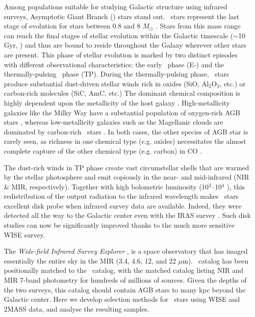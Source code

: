 Among populations suitable for studying Galactic structure using infrared surveys, Asymptotic Giant 
Branch (\agb) stars stand out. \agb\ stars represent the last stage of evolution for stars between 0.8 and 8 $M_\odot$ \citep{1983ARA&A..21..271I, 2005ARA&A..43..435H}. Stars from this mass range can reach the final stages of stellar evolution within the Galactic timescale ($\sim$10 Gyr, \citealt{1983ARA&A..21..271I}) and thus are bound to reside throughout the Galaxy wherever other stars are present. This phase of stellar evolution is marked by two distinct
episodes with different observational characteristics: the early \agb\, phase (E-\agb)  and the thermally-pulsing \agb\, phase (TP). During the thermally-pulsing phase, \agb\, stars produce substantial dust-driven stellar winds \citep[$10^{-7} < \dot{M} < 10^{-4}$ $M_\odot$ yr$^{-1}$,][]{2002A&A...391.1053O} rich in oxides (SiO, Al$_2$O$_3$, etc.) or carbon-rich molecules (SiC, AmC, etc.) The dominant chemical composition is highly dependent upon the metallicity of the host galaxy \citep{2005A&A...434..691M}. High-metallicity galaxies like  the Milky Way have a substantial population of oxygen-rich AGB stars \citep{1985A&A...152L...1H}, whereas low-metallicity galaxies such as the Magellanic clouds are dominated by carbon-rich \agb\ stars \citep{2011AJ....142..103B}. In both cases, the other species of AGB star is rarely seen, as richness in one chemical type (e.g. oxides)  necessitates the almost complete capture of the other chemical type (e.g. carbon) in CO \citep{1983ARA&A..21..271I}. 

The dust-rich winds in TP phase  create vast circumstellar shells that are warmed by the stellar photosphere and emit
copiously in the near- and mid-infrared (NIR \& MIR, respectively). Together with high bolometric luminosity
(10$^3$--10$^4$ \Mo), this redistribution of the output radiation to the infrared wavelength makes \agb\ stars
excellent disk probe when infrared survey data are available. Indeed, they were detected all the way to the 
Galactic center even with the IRAS survey \citep{2002MNRAS.337..749J}. Such disk studies can now be significantly
improved thanks to the much more sensitive WISE survey. 

The \emph{Wide-field Infrared Survey Explorer} \citep[\wise, ][]{2010AJ....140.1868W, 2012wise.rept....1C}, is a space observatory that has imaged essentially the entire sky in the MIR (3.4, 4.6, 12, and 22 $\mu$m). \wise\, catalog has been positionally matched to the \twomass\ catalog, with the matched catalog listing NIR and MIR 7-band photometry for
hundreds of millions of sources. Given the depths of the two surveys, this catalog should contain AGB stars to many
kpc beyond the Galactic center. Here we develop selection methods for \agb\ stars using WISE and 2MASS data,
and analyse the resulting samples. 

